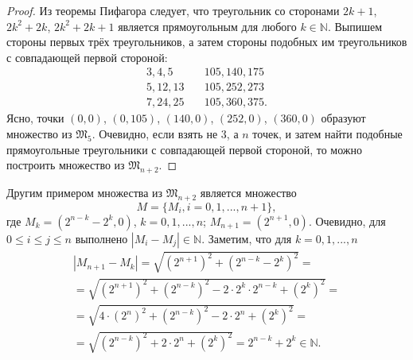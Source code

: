 \begin{proof}
	Из теоремы Пифагора следует, что треугольник со сторонами
	$2k+1$, $2k^2+2k$, $2k^2+2k+1$
	является прямоугольным для любого $k\in\mathbb{N}$.
	Выпишем стороны первых трёх треугольников,
	а затем стороны подобных им треугольников с совпадающей первой стороной:
	\begin{equation}
		\label{eq:PifagTriangles}
		\begin{array}{ll}
			3,  4,  5 & \quad 105, 140, 175 \\
			5, 12, 13 & \quad 105, 252, 273 \\
			7, 24, 25 & \quad 105, 360, 375.
		\end{array}
	\end{equation}
	Ясно, точки $(0,0)$, $(0,105)$, $(140,0)$, $(252,0)$, $(360,0)$
	образуют множество из $\mathfrak{M}_5$.
	Очевидно, если взять не 3, а $n$ точек, и затем найти подобные
	прямоугольные треугольники с совпадающей первой стороной,
	то можно построить множество из $\mathfrak{M}_{n+2}$.
\end{proof}

Другим примером множества из $\mathfrak{M}_{n+2}$ является множество
\begin{equation*}
	M = \{M_i, i =0,1,...,n+1\},
\end{equation*}
где
$M_k = (2^{n-k}-2^k,0)$, $k=0,1,...,n$;
$M_{n+1} = (2^{n+1},0)$.
Очевидно, для $0\leqslant i \leqslant j \leqslant n$ выполнено
$|M_i- M_j|\in\mathbb{N}$.
Заметим, что для $k=0,1,...,n$
\begin{multline*}
	|M_{n+1} - M_k| =
	\sqrt{(2^{n+1})^2 + (2^{n-k}-2^k)^2}
	=
	\\=
	\sqrt{(2^{n+1})^2 + (2^{n-k})^2 - 2\cdot 2^k \cdot 2^{n-k} + (2^k)^2}
	=
	\\=
	\sqrt{4\cdot (2^{n})^2 + (2^{n-k})^2 - 2\cdot 2^{n} + (2^k)^2}
	=
	\\=
	\sqrt{(2^{n-k})^2 + 2\cdot 2^{n} + (2^k)^2}
	=
	2^{n-k} + 2^k
	\in\mathbb{N}
	.
\end{multline*}

